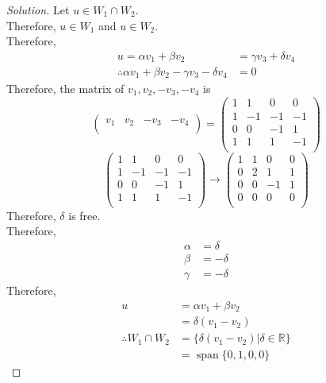 \documentclass[fleqn, a4paper, 12pt]{article}
\theoremstyle{definition}
\theoremstyle{theorem}
\newenvironment{solution}
{\begin{proof}[Solution]\let\qed\relax}
	{\end{proof}}
\DeclareMathOperator{\vspan}{\mathrm{span}} %
\begin{document}
\begin{solution}
	Let $u \in W_1 \cap W_2$.\\
	Therefore, $u \in W_1$ and $u \in W_2$.\\
	Therefore,
	\begin{align*}
		u = \alpha v_1 + \beta v_2 &= \gamma v_3 + \delta v_4\\
		\therefore \alpha v_1 + \beta v_2 - \gamma v_3 - \delta v_4 &= 0
	\end{align*}
	Therefore, the matrix of $v_1, v_2, -v_3, -v_4$ is
	\begin{equation*}
		\begin{pmatrix}
			v_1 & v_2 & -v_3 & -v_4\\
		\end{pmatrix}
		=
		\begin{pmatrix}
			1 & 1 & 0 & 0\\
			1 & -1 & -1 & -1\\
			0 & 0 & -1 & 1\\
			1 & 1 & 1 & -1\\
		\end{pmatrix}
	\end{equation*}
	\begin{equation*}
		\begin{pmatrix}
			1 & 1 & 0 & 0\\
			1 & -1 & -1 & -1\\
			0 & 0 & -1 & 1\\
			1 & 1 & 1 & -1\\
		\end{pmatrix}
		\to
		\begin{pmatrix}
			1 & 1 & 0 & 0\\
			0 & 2 & 1 & 1\\
			0 & 0 & -1 & 1\\
			0 & 0 & 0 & 0\\
		\end{pmatrix}
	\end{equation*}
	Therefore, $\delta$ is free.\\
	Therefore,
	\begin{align*}
		\alpha &= \delta\\
		\beta &= -\delta\\
		\gamma &= -\delta
	\end{align*}
	Therefore,
	\begin{align*}
		u &= \alpha v_1 + \beta v_2\\
		&= \delta (v_1 - v_2)\\
		\therefore W_1 \cap W_2 &= \{\delta (v_1 - v_2) | \delta \in \mathbb{R}\}\\
		&= \vspan \{0, 1, 0, 0\}
	\end{align*}
\end{solution}
\end{document}
